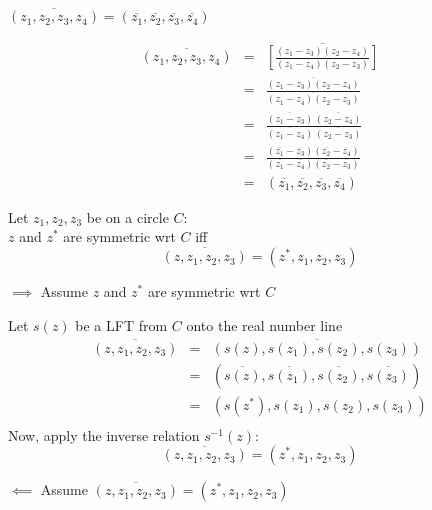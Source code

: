 \documentclass[letterpaper,12pt,fleqn]{article}
\newcommand{\conj}[1]{\overline{#1}}
\begin{document}
\begin{lemma}
  $\conj{(z_1,z_2,z_3,z_4)}=(\conj{z_1},\conj{z_2},\conj{z_3},\conj{z_4})$
\end{lemma}
\newpage
\begin{theproof}
  \listbreak
  \begin{eqnarray*}
    \conj{(z_1,z_2,z_3,z_4)} &=&
    \conj{\left[\frac{(z_1-z_3)(z_2-z_4)}{(z_1-z_4)(z_2-z_3)}\right]} \\
    &=& \frac{\conj{(z_1-z_3)(z_2-z_4)}}{\conj{(z_1-z_4)(z_2-z_3)}} \\
    &=& \frac{\conj{(z_1-z_3)}\,\conj{(z_2-z_4)}}
         {\conj{(z_1-z_4)}\,\conj{(z_2-z_3)}} \\
    &=& \frac{(\conj{z_1}-\conj{z_3})(\conj{z_2}-\conj{z_4})}
         {(\conj{z_1}-\conj{z_4})(\conj{z_2}-\conj{z_3})} \\
    &=& (\conj{z_1},\conj{z_2},\conj{z_3},\conj{z_4})
  \end{eqnarray*}
\end{theproof}

\begin{theorem}
  Let $z_1,z_2,z_3$ be on a circle $C$: \\
  $z$ and $z^*$ are symmetric wrt $C$ iff
  \[\conj{(z,z_1,z_2,z_3)}=(z^*,z_1,z_2,z_3)\]
\end{theorem}

\begin{theproof}
  \listbreak
  \begin{description}
    \item $\implies$ Assume $z$ and $z^*$ are symmetric wrt $C$

      Let $s(z)$ be a LFT from $C$ onto the real number line
      \begin{eqnarray*}
        \conj{(z,z_1,z_2,z_3)} &=& \conj{(s(z),s(z_1),s(z_2),s(z_3))} \\
        &=& (\conj{s(z)},\conj{s(z_1)},\conj{s(z_2)},\conj{s(z_3)}) \\
        &=& (s(z^*),s(z_1),s(z_2),s(z_3)) \\
      \end{eqnarray*}
      Now, apply the inverse relation $s^{-1}(z)$:
      \[\conj{(z,z_1,z_2,z_3)}=(z^*,z_1,z_2,z_3)\]

    \item $\impliedby$ Assume $\conj{(z,z_1,z_2,z_3)}=(z^*,z_1,z_2,z_3)$
  \end{description}
\end{theproof}
\end{document}
